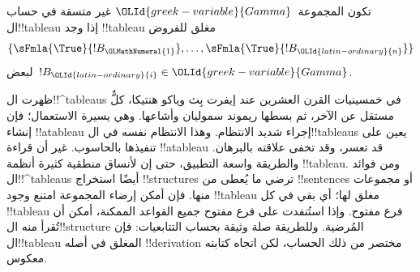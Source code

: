 \documentclass[../../../include/open-logic-section]{subfiles}
\begin{document}
تكون المجموعة~$\OLId{greek-variable}{Gamma}$ غير متسقة في حساب ال!!{tableau} إذا وجد
!!{tableau} مغلق للفروض
\[
\{\sFmla{\True}{!B_\OLMathNumeral{1}}, \dots, \sFmla{\True}{!B_\OLId{latin-ordinary}{n}}\} 
\]
لبعض~$!B_\OLId{latin-ordinary}{i} \in \OLId{greek-variable}{Gamma}$.

ظهرت ال!!^{tableau}s في خمسينيات القرن العشرين عند إيفرت بِث وياكو هنتيكا، كلٌّ مستقل عن الآخر، ثم بسطها ريموند سموليان وأشاعها.
وهي يسيرة الاستعمال؛ فإن إنشاء !!a{tableau} إجراء شديد الانتظام. وهذا الانتظام نفسه في ال!!{tableau}s يعين على تنفيذها بالحاسوب.
غير أن قراءة !!a{tableau} قد تعسر، وقد تخفى علاقته بالبرهان. والطريقة واسعة التطبيق، حتى إن لأنساق منطقية كثيرة أنظمة
!!{tableau}. ومن فوائد ال!!^{tableau}s أيضًا استخراج
!!{structure}s ترضي ما يُعطى من !!{sentence}s أو مجموعات منها.
فإن أمكن إرضاء المجموعة امتنع وجود !!{tableau} مغلق لها؛ أي بقي في كل
!!{tableau} فرع مفتوح. وإذا استُنفدت على فرع مفتوح جميع القواعد الممكنة، أمكن أن تُقرأ منه ال!!{structure} المُرضية.
وللطريقة صلة وثيقة بحساب التتابعيات: فإن ال!!{tableau} المغلق في أصله
!!{derivation} مختصر من ذلك الحساب، لكن اتجاه كتابته معكوس.
\end{document}
